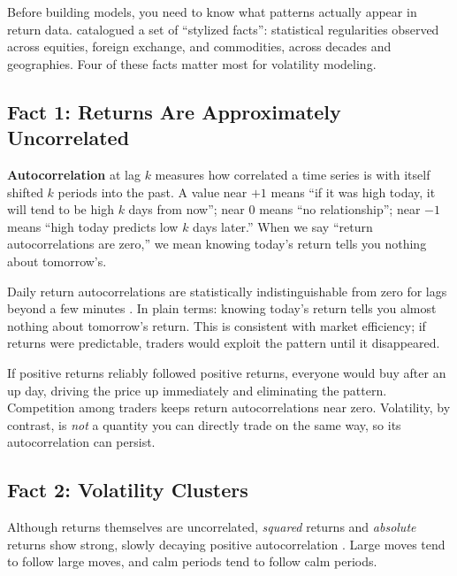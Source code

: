 Before building models, you need to know what patterns actually appear in return data.
\citet{Cont2001} catalogued a set of ``stylized facts'': statistical regularities observed across equities, foreign exchange, and commodities, across decades and geographies.
Four of these facts matter most for volatility modeling.

\subsection{Fact 1: Returns Are Approximately Uncorrelated}
\label{sec:fact-uncorrelated}

\begin{prereq}[Autocorrelation]
\textbf{Autocorrelation} at lag $k$ measures how correlated a time series is with itself shifted $k$ periods into the past.
A value near $+1$ means ``if it was high today, it will tend to be high $k$ days from now''; near $0$ means ``no relationship''; near $-1$ means ``high today predicts low $k$ days later.''
When we say ``return autocorrelations are zero,'' we mean knowing today's return tells you nothing about tomorrow's.
\end{prereq}

Daily return autocorrelations are statistically indistinguishable from zero for lags beyond a few minutes \citep{Cont2001}.
In plain terms: knowing today's return tells you almost nothing about tomorrow's return.
This is consistent with market efficiency; if returns were predictable, traders would exploit the pattern until it disappeared.

\begin{intuition}
If positive returns reliably followed positive returns, everyone would buy after an up day, driving the price up immediately and eliminating the pattern.
Competition among traders keeps return autocorrelations near zero.
Volatility, by contrast, is \emph{not} a quantity you can directly trade on the same way, so its autocorrelation can persist.
\end{intuition}

\subsection{Fact 2: Volatility Clusters}
\label{sec:fact-clustering}

Although returns themselves are uncorrelated, \emph{squared} returns and \emph{absolute} returns show strong, slowly decaying positive autocorrelation \citep{Cont2001, Mandelbrot1963}.
Large moves tend to follow large moves, and calm periods tend to follow calm periods.

